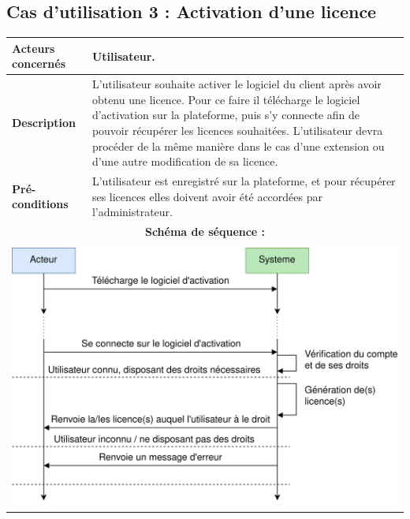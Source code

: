 \subsection{Cas d'utilisation 3 : Activation d'une licence}

\begin{table}[!h]
        \centering
        \begin{tabular}{| m{4cm} | m{12cm} |}
                \hline
		    \textbf{Acteurs concernés} & Utilisateur. \\
                \hline
		    \textbf{Description} & L'utilisateur souhaite activer le logiciel du client après avoir obtenu une licence. Pour ce faire il télécharge le logiciel d'activation sur la plateforme, puis s'y connecte afin de pouvoir récupérer les licences souhaitées.\newline
		    L'utilisateur devra procéder de la même manière dans le cas d'une extension ou d'une autre modification de sa licence.\\
                \hline
		    \textbf{Pré-conditions} & L'utilisateur est enregistré sur la plateforme, et pour récupérer ses licences elles doivent avoir été accordées par l'administrateur.\\
		\hline
		    \multicolumn{2}{|c|}{\textbf{Schéma de séquence :}} \\
                \hline
                    \multicolumn{2}{|c|}{}\\
                    \multicolumn{2}{|c|}{\includegraphics[width=15cm]{main/png/seq_activation.png}} \\
                \hline
        \end{tabular}
        \label{tab:tab3}
\end{table}
\newpage

